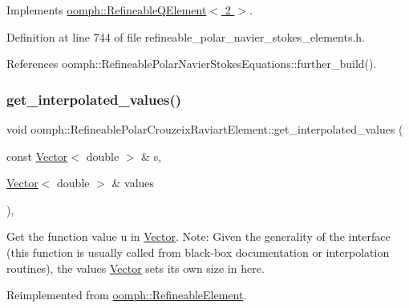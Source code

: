 Implements \hyperlink{classoomph_1_1RefineableQElement_3_012_01_4_a01e1eb063dd2c98ebb42d87959ca6b88}{oomph\+::\+Refineable\+Q\+Element$<$ 2 $>$}.



Definition at line 744 of file refineable\+\_\+polar\+\_\+navier\+\_\+stokes\+\_\+elements.\+h.



References oomph\+::\+Refineable\+Polar\+Navier\+Stokes\+Equations\+::further\+\_\+build().

\mbox{\label{classoomph_1_1RefineablePolarCrouzeixRaviartElement_a93600266d1ddfefb4275d4bc38f5d62c}} 
\subsubsection{\texorpdfstring{get\+\_\+interpolated\+\_\+values()}{get\_interpolated\_values()}\hspace{0.1cm}{\footnotesize\ttfamily [1/2]}}
{\footnotesize\ttfamily void oomph\+::\+Refineable\+Polar\+Crouzeix\+Raviart\+Element\+::get\+\_\+interpolated\+\_\+values (\begin{DoxyParamCaption}\item[{const \hyperlink{classoomph_1_1Vector}{Vector}$<$ double $>$ \&}]{s,  }\item[{\hyperlink{classoomph_1_1Vector}{Vector}$<$ double $>$ \&}]{values }\end{DoxyParamCaption})\hspace{0.3cm}{\ttfamily [inline]}, {\ttfamily [virtual]}}



Get the function value u in \hyperlink{classoomph_1_1Vector}{Vector}. Note\+: Given the generality of the interface (this function is usually called from black-\/box documentation or interpolation routines), the values \hyperlink{classoomph_1_1Vector}{Vector} sets its own size in here. 



Reimplemented from \hyperlink{classoomph_1_1RefineableElement_ad9a4f92880668a2373326d8306365c43}{oomph\+::\+Refineable\+Element}.



